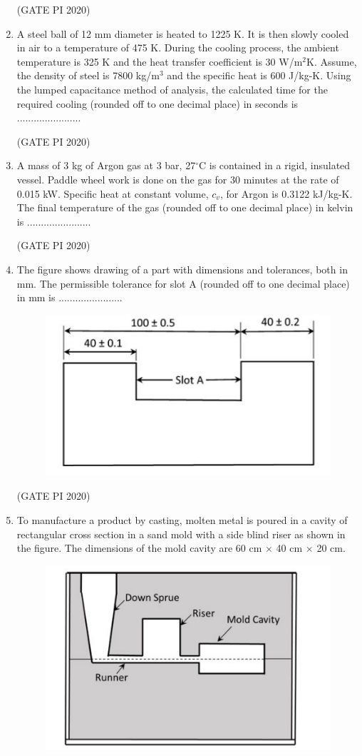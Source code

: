 \documentclass[journal,12pt,onecolumn]{IEEEtran}
\theoremstyle{remark}
\begin{document}
\begin{enumerate}
\hfill (GATE PI 2020)

\item A steel ball of 12 mm diameter is heated to 1225 K. It is then slowly cooled in air to a temperature of 475 K. During the cooling process, the ambient temperature is 325 K and the heat transfer coefficient is 30 W/m$^2$K. Assume, the density of steel is 7800 kg/m$^3$ and the specific heat is 600 J/kg-K. Using the lumped capacitance method of analysis, the calculated time for the required cooling (rounded off to one decimal place) in seconds is ....................... 

\hfill (GATE PI 2020)

\item A mass of 3 kg of Argon gas at 3 bar, 27$^\circ$C is contained in a rigid, insulated vessel. Paddle wheel work is done on the gas for 30 minutes at the rate of 0.015 kW. Specific heat at constant volume, $c_v$, for Argon is 0.3122 kJ/kg-K. The final temperature of the gas (rounded off to one decimal place) in kelvin is ....................... 

\hfill (GATE PI 2020)

\item The figure shows drawing of a part with dimensions and tolerances, both in mm. The permissible tolerance for slot A (rounded off to one decimal place) in mm is ....................... 
\begin{figure}[h]
    \centering
    \includegraphics[width=0.5\columnwidth]{figs/fig15.png}
    \caption{}
    \label{fig:placeholder}
\end{figure}

\hfill (GATE PI 2020)

\item To manufacture a product by casting, molten metal is poured in a cavity of rectangular cross section in a sand mold with a side blind riser as shown in the figure. The dimensions of the mold cavity are 60 cm $\times$ 40 cm $\times$ 20 cm.

\begin{figure}[h]
    \centering
    \includegraphics[width=0.5\columnwidth]{figs/fig16.png}
    \caption{}
    \label{fig:placeholder}
\end{figure}


\end{enumerate}
\end{document}
